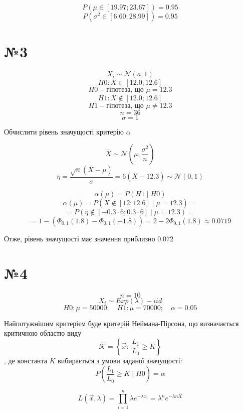 \documentclass[11pt, a4paper]{article} %
\begin{document}
\begin{mdframed}[style=ans]
    $$P(\mu \in [19.97; 23.67]) = 0.95$$
    $$P(\sigma^2 \in [6.60; 28.99]) = 0.95$$
\end{mdframed}

\pagebreak

\section*{№3}

\begin{mdframed}
    $$X_i \sim \mathcal N (a,1)$$
    $$H0: \overline X \in [12.0; 12.6]$$
    $$H0 - \text{гіпотеза, що } \mu = 12.3$$
    $$H1: \overline X \notin [12.0; 12.6]$$
    $$H1 - \text{гіпотеза, що } \mu \ne 12.3$$
    $$n = 36$$
    $$\sigma = 1$$

    Обчислити рівень значущості критерію $\alpha$
\end{mdframed}

$$\overline X \sim \mathcal{N}(\mu, \frac{\sigma^2}{n})$$
$$\eta = \frac{\sqrt n (\overline X - \mu)}{\sigma} = 6(\overline X - 12.3) \sim \mathcal{N}(0,1)$$

$$\alpha(\mu) = P(H1 \;|\; H0)$$
$$\alpha(\mu) = P(\overline X \notin [12; 12.6] \; | \; \mu = 12.3) = $$
$$= P(\eta \notin [-0.3\cdot 6; 0.3 \cdot 6] \;|\; \mu = 12.3) = $$
$$= 1-\left(\Phi_{0,1}(1.8)-\Phi_{0,1}(-1.8)\right) = 2 - 2\Phi_{0,1}(1.8) \approx 0.0719$$

\begin{mdframed}[style=ans]
    Отже, рівень значущості має значення приблизно $0.072$
\end{mdframed}


\section*{№4}
\begin{mdframed}
    $$n = 10$$
    $$X_i \sim Exp(\lambda) - iid$$
    $$H0: \mu = 50000;\quad H1: \mu = 70000;\quad \alpha=0.05$$
\end{mdframed}

Найпотужнішим критерієм буде критерій Неймана-Пірсона, що визначається критичною областю виду 
$$\mathcal K = \left\{ \vec x :\; \frac{L_1}{L_0} \ge K \right\}$$
, де константа $K$ вибирається з умови заданої значущості:
$$P(\frac{L_1}{L_0} \ge K \;|\; H0) = \alpha$$

$$L(\vec x, \lambda) = \prod_{i=1}^n \lambda e^{-\lambda x_i} = \lambda^n e^{-\lambda n \overline X }$$
\end{document}
